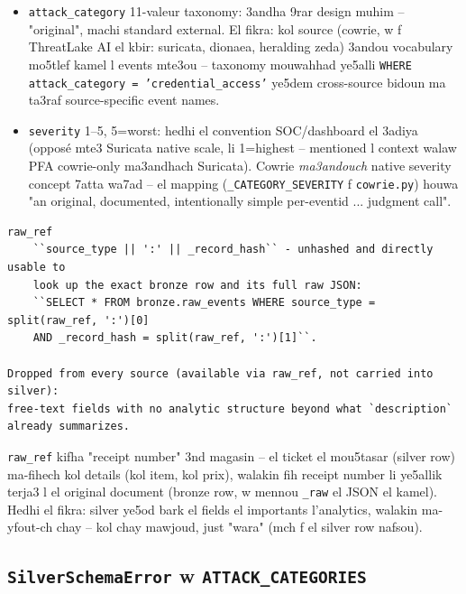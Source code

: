 \documentclass[11pt,a4paper]{report}
\DeclareRobustCommand{\code}[1]{\texttt{#1}}
\begin{document}
\begin{itemize}
  \item \code{attack\_category} 11-valeur taxonomy: 3andha 9rar design
        muhim -- "original", machi standard external. El fikra: kol source
        (cowrie, w f ThreatLake AI el kbir: suricata, dionaea, heralding
        zeda) 3andou vocabulary mo5tlef kamel l events mte3ou -- taxonomy
        mouwahhad ye5alli \code{WHERE attack\_category = 'credential\_access'}
        ye5dem cross-source bidoun ma ta3raf source-specific event names.
  \item \code{severity} 1--5, 5=worst: hedhi el convention SOC/dashboard
        el 3adiya (opposé mte3 Suricata native scale, li 1=highest --
        mentioned l context walaw PFA cowrie-only ma3andhach Suricata).
        Cowrie \emph{ma3andouch} native severity concept 7atta wa7ad --
        el mapping (\code{\_CATEGORY\_SEVERITY} f \code{cowrie.py}) houwa
        "an original, documented, intentionally simple per-eventid ...
        judgment call".
\end{itemize}

\begin{lstlisting}[style=pystyle]
raw_ref
    ``source_type || ':' || _record_hash`` - unhashed and directly usable to
    look up the exact bronze row and its full raw JSON:
    ``SELECT * FROM bronze.raw_events WHERE source_type = split(raw_ref, ':')[0]
    AND _record_hash = split(raw_ref, ':')[1]``.

Dropped from every source (available via raw_ref, not carried into silver):
free-text fields with no analytic structure beyond what `description`
already summarizes.
\end{lstlisting}

\begin{analogy}
\code{raw\_ref} kifha "receipt number" 3nd magasin -- el ticket el mou5tasar
(silver row) ma-fihech kol details (kol item, kol prix), walakin fih
receipt number li ye5allik terja3 l el original document (bronze row, w
mennou \code{\_raw} el JSON el kamel). Hedhi el fikra: silver ye5od bark
el fields el importants l'analytics, walakin ma-yfout-ch chay -- kol chay
mawjoud, just "wara" (mch f el silver row nafsou).
\end{analogy}

\subsection{\code{SilverSchemaError} w \code{ATTACK\_CATEGORIES}}
\end{document}
